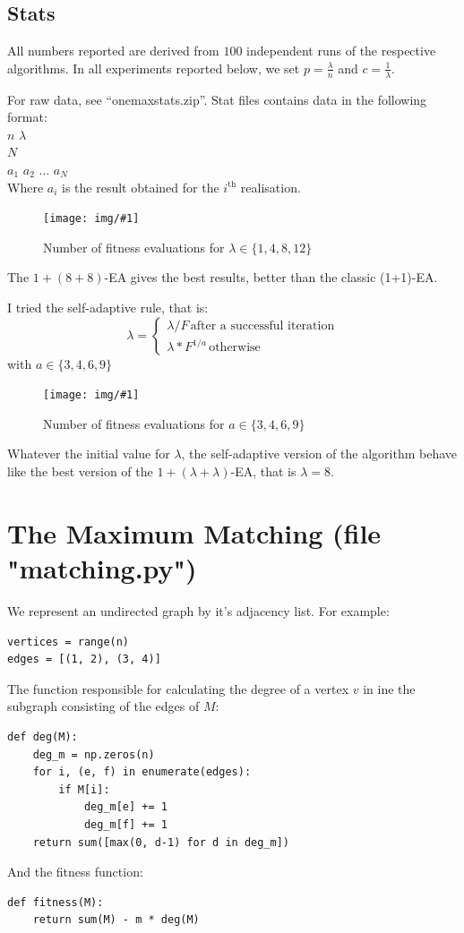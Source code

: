 \documentclass{article}
\newcommand{\IMG}[3]{
\begin{figure}[H]
\centering
\texttt{[image: img/\#1]}%
\caption{#2}%
\label{#1}%
\end{figure}

}
\newcommand{\Stats}{\subsection{Stats}}
\begin{document}
\Stats
All numbers reported are derived from $100$ independent runs of the respective algorithms. 
In all experiments reported below, we set $p = \frac{\lambda}{n}$ and $c = \frac{1}{\lambda}$.

For raw data, see "`onemaxstats.zip"'. Stat files contains data in the following format:\\
$n$  $\lambda $ \\
$N$ \\
$a_1$ $a_2$ ... $a_N$ \\
Where $a_i$ is the result obtained for the $i^{\text{th}}$ realisation.

\IMG{stat_onemax_1.png}{Number of fitness evaluations for $\lambda \in \{1, 4, 8, 12\}$}{0.5}

The $1+(8+8)$-EA gives the best results, better than the classic (1+1)-EA.

I tried the self-adaptive rule, that is:
$$ \lambda = \left\{
\begin{array}{l}
  \lambda / F \, \text{after a successful iteration} \\
  \lambda * F^{1/a} \, \text{otherwise}
\end{array}
\right.$$
with $a \in \{3, 4, 6, 9\}$
\IMG{stat_onemax_2.png}{Number of fitness evaluations for $a \in \{3, 4, 6, 9\}$}{0.5}
Whatever the initial value for $\lambda$, the self-adaptive version of the algorithm behave like the best version of the $1+(\lambda+\lambda)$-EA, that is $\lambda=8$.

\section{The Maximum Matching  (file "matching.py")}
We represent an undirected graph by it's adjacency list. For example:
\begin{verbatim}
vertices = range(n)
edges = [(1, 2), (3, 4)]
\end{verbatim}

The function responsible for calculating the degree of a vertex $v$ in ine the subgraph consisting of the edges of $M$:
\begin{verbatim}
def deg(M):
    deg_m = np.zeros(n)
    for i, (e, f) in enumerate(edges):
        if M[i]:
            deg_m[e] += 1
            deg_m[f] += 1
    return sum([max(0, d-1) for d in deg_m])
\end{verbatim}

And the fitness function:

\begin{verbatim}
def fitness(M): 
    return sum(M) - m * deg(M)
\end{verbatim}
\end{document}
